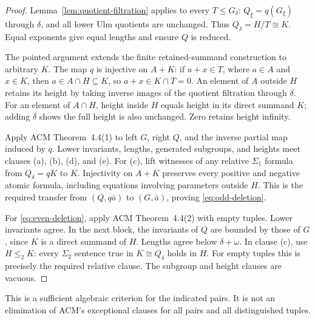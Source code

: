 \documentclass[11pt]{article}
\begin{document}
\begin{proof}
Lemma~\ref{lem:quotient-filtration} applies to every $T\le G_\delta$:
$Q_\xi=q(G_\xi)$ through $\delta$, and all lower Ulm quotients are
unchanged. Thus $Q_\delta=H/T\cong K$. Equal exponents give equal
lengths and ensure $Q$ is reduced.

The pointed argument extends the finite retained-summand construction to arbitrary
$K$. The map $q$ is injective on $A+K$: if $a+x\in T$, where $a\in A$
and $x\in K$, then $a\in A\cap H\subseteq K$, so $a+x\in K\cap T=0$.
An element of $A$ outside $H$ retains its height by taking inverse
images of the quotient filtration through $\delta$. For an element
of $A\cap H$, height inside $H$ equals height in its direct summand
$K$; adding $\delta$ shows the full height is also unchanged.
Zero retains height infinity.

Apply ACM Theorem~4.4(1) to left $G$, right $Q$, and the inverse
partial map induced by $q$. Lower invariants, lengths, generated
subgroups, and heights meet clauses (a), (b), (d), and (e).
For (c), lift witnesses of any relative $\Sigma_1$ formula from
$Q_\delta=qK$ to $K$. Injectivity on $A+K$ preserves every positive
and negative atomic formula, including equations involving parameters
outside $H$. This is the required transfer from $(Q,q\bar a)$ to
$(G,\bar a)$, proving \eqref{eq:odd-deletion}.

For \eqref{eq:even-deletion}, apply ACM Theorem~4.4(2) with empty
tuples. Lower invariants agree. In the next block, the invariants of
$Q$ are bounded by those of $G$, since $K$ is a direct summand of $H$.
Lengths agree below $\delta+\omega$. In clause (c), use $H\le_2K$:
every $\Sigma_2$ sentence true in $K\cong Q_\delta$ holds in $H$.
For empty tuples this is precisely the required relative clause.
The subgroup and height clauses are vacuous.
\end{proof}

This is a sufficient algebraic criterion for the indicated pairs.
It is not an elimination of ACM's exceptional clauses for all pairs
and all distinguished tuples.
\end{document}
